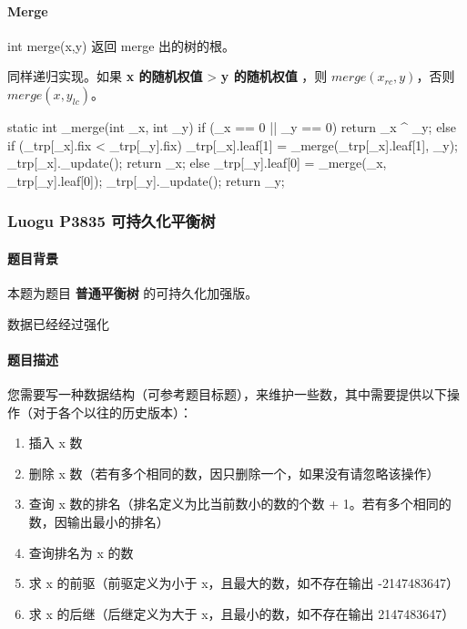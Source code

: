 \paragraph{Merge}

int merge(x,y) 返回 merge 出的树的根。

同样递归实现。如果 \textbf{x 的随机权值} > \textbf{y 的随机权值} ，则 $merge(x_{rc},y)$，否则 $merge(x,y_{lc})$。

\begin{cppcode}
static int _merge(int _x, int _y) {
  if (_x == 0 || _y == 0)
    return _x ^ _y;
  else {
    if (_trp[_x].fix < _trp[_y].fix) {
      _trp[_x].leaf[1] = _merge(_trp[_x].leaf[1], _y);
      _trp[_x]._update();
      return _x;
    } else {
      _trp[_y].leaf[0] = _merge(_x, _trp[_y].leaf[0]);
      _trp[_y]._update();
      return _y;
    }
  }
}
\end{cppcode}

\subsubsection{Luogu P3835 可持久化平衡树}

\paragraph{题目背景}

本题为题目 \textbf{普通平衡树} 的可持久化加强版。

数据已经经过强化

\paragraph{题目描述}

您需要写一种数据结构（可参考题目标题），来维护一些数，其中需要提供以下操作（对于各个以往的历史版本）：

\begin{enumerate}
\item 插入 x 数
\item 删除 x 数（若有多个相同的数，因只删除一个，如果没有请忽略该操作）
\item 查询 x 数的排名（排名定义为比当前数小的数的个数 + 1。若有多个相同的数，因输出最小的排名）
\item 查询排名为 x 的数
\item 求 x 的前驱（前驱定义为小于 x，且最大的数，如不存在输出 -2147483647）
\item 求 x 的后继（后继定义为大于 x，且最小的数，如不存在输出 2147483647）
\end{enumerate}

